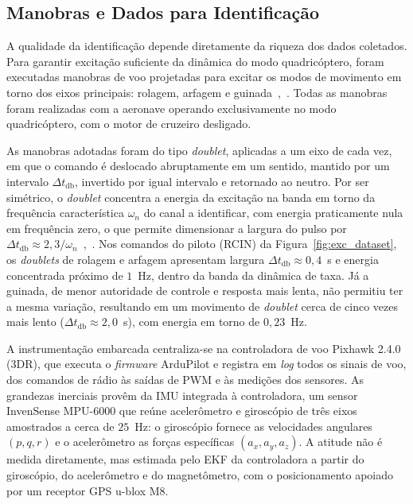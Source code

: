 \documentclass{ieeeaccess}
\begin{document}
\subsection{Manobras e Dados para Identificação}

A qualidade da identificação depende diretamente da riqueza dos dados coletados. Para garantir excitação suficiente da dinâmica do modo quadricóptero, foram executadas manobras de voo projetadas para excitar os modos de movimento em torno dos eixos principais: rolagem, arfagem e guinada~\cite{c7},~\cite{c8}. Todas as manobras foram realizadas com a aeronave operando exclusivamente no modo quadricóptero, com o motor de cruzeiro desligado.

As manobras adotadas foram do tipo \textit{doublet}, aplicadas a um eixo de cada vez, em que o comando é deslocado abruptamente em um sentido, mantido por um intervalo $\Delta t_{\text{db}}$, invertido por igual intervalo e retornado ao neutro. Por ser simétrico, o \textit{doublet} concentra a energia da excitação na banda em torno da frequência característica $\omega_n$ do canal a identificar, com energia praticamente nula em frequência zero, o que permite dimensionar a largura do pulso por $\Delta t_{\text{db}} \approx 2{,}3/\omega_n$~\cite{c2},~\cite{c3}. Nos comandos do piloto (RCIN) da Figura~\ref{fig:exc_dataset}, os \textit{doublets} de rolagem e arfagem apresentam largura $\Delta t_{\text{db}} \approx 0{,}4$~s e energia concentrada próximo de $1$~Hz, dentro da banda da dinâmica de taxa. Já a guinada, de menor autoridade de controle e resposta mais lenta, não permitiu ter a mesma variação, resultando em um movimento de \textit{doublet} cerca de cinco vezes mais lento ($\Delta t_{\text{db}} \approx 2{,}0$~s), com energia em torno de $0{,}23$~Hz.

A instrumentação embarcada centraliza-se na controladora de voo Pixhawk 2.4.0 (3DR), que executa o \textit{firmware} ArduPilot e registra em \textit{log} todos os sinais de voo, dos comandos de rádio às saídas de PWM e às medições dos sensores. As grandezas inerciais provêm da IMU integrada à controladora, um sensor InvenSense MPU-6000 que reúne acelerômetro e giroscópio de três eixos amostrados a cerca de $25$~Hz: o giroscópio fornece as velocidades angulares $(p, q, r)$ e o acelerômetro as forças específicas $(a_x, a_y, a_z)$. A atitude não é medida diretamente, mas estimada pelo EKF da controladora a partir do giroscópio, do acelerômetro e do magnetômetro, com o posicionamento apoiado por um receptor GPS u-blox M8.
\end{document}
